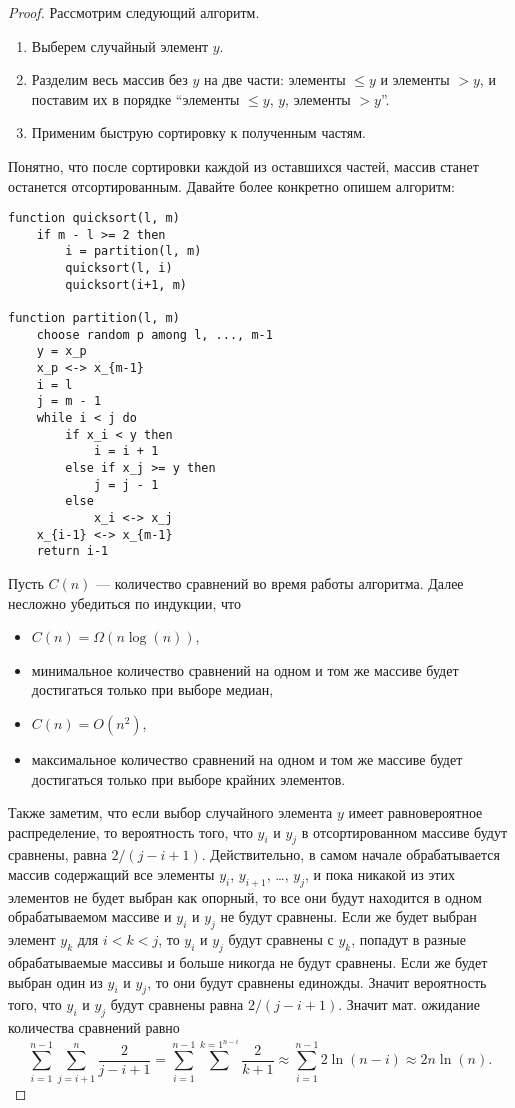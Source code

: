 \documentclass[12pt,a4paper]{article}
\begin{document}
    \begin{proof}
        Рассмотрим следующий алгоритм.
        \begin{enumerate}
            \item Выберем случайный элемент $y$.
            \item Разделим весь массив без $y$ на две части: элементы $\leqslant y$ и элементы $> y$, и поставим их в порядке ``элементы $\leqslant y$, $y$, элементы $> y$''.
            \item Применим быструю сортировку к полученным частям.
        \end{enumerate}
        Понятно, что после сортировки каждой из оставшихся частей, массив станет останется отсортированным. Давайте более конкретно опишем алгоритм:
        \begin{verbatim}
function quicksort(l, m)
    if m - l >= 2 then
        i = partition(l, m)
        quicksort(l, i)
        quicksort(i+1, m)

function partition(l, m)
    choose random p among l, ..., m-1
    y = x_p
    x_p <-> x_{m-1}
    i = l
    j = m - 1
    while i < j do
        if x_i < y then
            i = i + 1
        else if x_j >= y then
            j = j - 1
        else
            x_i <-> x_j
    x_{i-1} <-> x_{m-1}
    return i-1
        \end{verbatim}

        Пусть $C(n)$ --- количество сравнений во время работы алгоритма. Далее несложно убедиться по индукции, что
        \begin{itemize}
            \item $C(n) = \Omega(n \log(n))$,
            \item минимальное количество сравнений на одном и том же массиве будет достигаться только при выборе медиан,
            \item $C(n) = O(n^2)$,
            \item максимальное количество сравнений на одном и том же массиве будет достигаться только при выборе крайних элементов.
        \end{itemize}

        Также заметим, что если выбор случайного элемента $y$ имеет равновероятное распределение, то вероятность того, что $y_i$ и $y_j$ в отсортированном массиве будут сравнены, равна $2/(j-i+1)$. Действительно, в самом начале обрабатывается массив содержащий все элементы $y_i$, $y_{i+1}$, \dots, $y_j$, и пока никакой из этих элементов не будет выбран как опорный, то все они будут находится в одном обрабатываемом массиве и $y_i$ и $y_j$ не будут сравнены. Если же будет выбран элемент $y_k$ для $i < k < j$, то $y_i$ и $y_j$ будут сравнены с $y_k$, попадут в разные обрабатываемые массивы и больше никогда не будут сравнены. Если же будет выбран один из $y_i$ и $y_j$, то они будут сравнены единожды. Значит вероятность того, что $y_i$ и $y_j$ будут сравнены равна $2/(j-i+1)$. Значит мат. ожидание количества сравнений равно
        \[
            \sum_{i=1}^{n-1} \sum_{j=i+1}^n \frac{2}{j-i+1}
            = \sum_{i=1}^{n-1} \sum^{k=1}^{n-i} \frac{2}{k+1}
            \approx \sum_{i=1}^{n-1} 2\ln(n-i)
            \approx 2n \ln(n).
        \]

        
    \end{proof}
\end{document}
